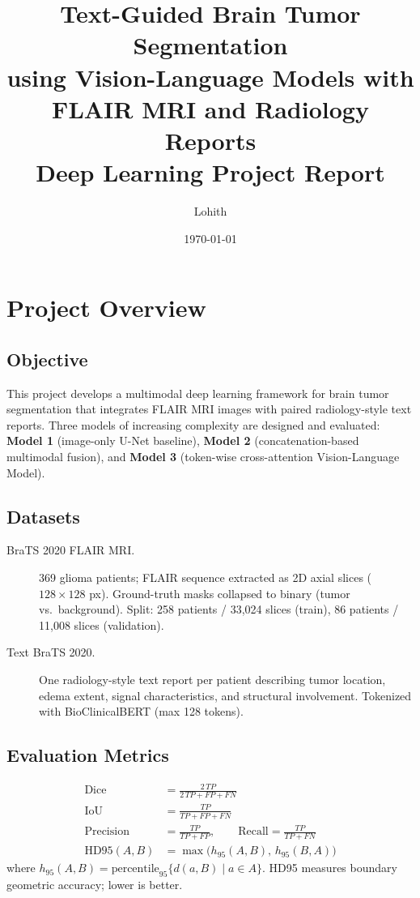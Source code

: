\documentclass[12pt,a4paper]{article}
\title{
    \vspace{-1cm}
    {\Large\bfseries Text-Guided Brain Tumor Segmentation}\\[0.4em]
    {\large using Vision-Language Models with FLAIR MRI and Radiology Reports}\\[1em]
    {\normalsize Deep Learning Project Report}
}
\author{Lohith}
\date{\today}
\begin{document}
\maketitle
\tableofcontents
\newpage

\section{Project Overview}

\subsection{Objective}
This project develops a multimodal deep learning framework for brain tumor segmentation
that integrates FLAIR MRI images with paired radiology-style text reports.
Three models of increasing complexity are designed and evaluated:
\textbf{Model 1} (image-only U-Net baseline),
\textbf{Model 2} (concatenation-based multimodal fusion), and
\textbf{Model 3} (token-wise cross-attention Vision-Language Model).

\subsection{Datasets}

\begin{description}
  \item[BraTS 2020 FLAIR MRI.]
    369 glioma patients; FLAIR sequence extracted as 2D axial slices
    ($128 \times 128$ px). Ground-truth masks collapsed to binary
    (tumor vs.\ background). Split: 258 patients / 33{,}024 slices (train),
    86 patients / 11{,}008 slices (validation).

  \item[Text BraTS 2020.]
    One radiology-style text report per patient describing tumor location,
    edema extent, signal characteristics, and structural involvement.
    Tokenized with BioClinicalBERT (max 128 tokens).
\end{description}

\subsection{Evaluation Metrics}

\begin{align}
  \text{Dice} &= \frac{2\,TP}{2\,TP + FP + FN} \label{eq:dice}\\[4pt]
  \text{IoU}  &= \frac{TP}{TP + FP + FN} \label{eq:iou}\\[4pt]
  \text{Precision} &= \frac{TP}{TP+FP},\qquad
  \text{Recall}    = \frac{TP}{TP+FN} \label{eq:pr}\\[4pt]
  \text{HD95}(A,B) &= \max\!\bigl(h_{95}(A,B),\,h_{95}(B,A)\bigr) \label{eq:hd95}
\end{align}
where $h_{95}(A,B)=\text{percentile}_{95}\{d(a,B)\mid a\in A\}$.
HD95 measures boundary geometric accuracy; lower is better.
\end{document}
